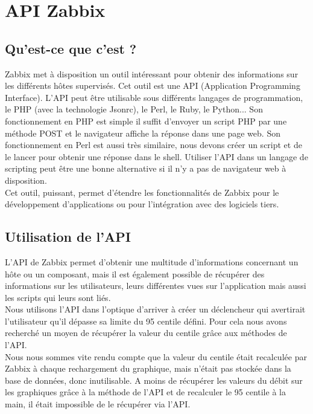 \section{API Zabbix}
	\subsection{Qu'est-ce que c'est ?}
		\vspace{0.3cm}

		Zabbix met à disposition un outil intéressant pour obtenir des informations sur les différents hôtes supervisés. Cet outil est une API (Application Programming Interface). L'API peut être utilisable sous différents langages de programmation, le PHP (avec la technologie Jsonrc), le Perl, le Ruby, le Python... Son fonctionnement en PHP est simple il suffit d'envoyer un script PHP par une méthode POST et le navigateur affiche la réponse dans une page web. Son fonctionnement en Perl est aussi très similaire, nous devons créer un script et de le lancer pour obtenir une réponse dans le shell. Utiliser l'API dans un langage de scripting peut être une bonne alternative si il n'y a pas de navigateur web à disposition.\\

		Cet outil, puissant, permet d'étendre les fonctionnalités de Zabbix pour le développement d'applications ou pour l'intégration avec des logiciels tiers.\\

	\subsection{Utilisation de l'API}
		\vspace{0.3cm}

		L'API de Zabbix permet d'obtenir une multitude d'informations concernant un hôte ou un composant, mais il est également possible de récupérer des informations sur les utilisateurs, leurs différentes vues sur l'application mais aussi les scripts qui leurs sont liés.\\

		Nous utilisons l'API dans l'optique d'arriver à créer un déclencheur qui avertirait l'utilisateur qu'il dépasse sa limite du 95 centile défini. Pour cela nous avons recherché un moyen de récupérer la valeur du centile grâce aux méthodes de l'API.\\

		Nous nous sommes vite rendu compte que la valeur du centile était recalculée par Zabbix à chaque rechargement du graphique, mais n'était pas stockée dans la base de données, donc inutilisable. A moins de récupérer les valeurs du débit sur les graphiques grâce à la méthode de l'API et de recalculer le 95 centile à la main, il était impossible de le récupérer via l'API.\\

